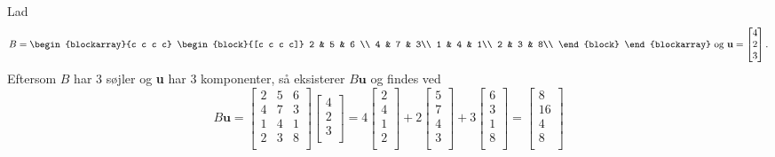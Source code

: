 \begin{eks}
\label{Matrix-vektor}
%
Lad
$$B=
\begin{blockarray}{c c c c}
\begin{block}{[c c c c]}
2 & 5 & 6 \\
4 & 7 & 3\\
1 & 4 & 1\\
2 & 3 & 8\\
\end{block}
\end{blockarray}
%
\text{ og }
%
\textbf{u}=
\begin{bmatrix}
4 \\
2 \\
3 \\ 
\end{bmatrix}.
$$
%
Eftersom $B$ har 3 søjler og \textbf{u} har 3 komponenter, så eksisterer $B\textbf{u}$ og findes ved
$$
B\textbf{u}=
\begin{bmatrix}
2 & 5 & 6 \\
4 & 7 & 3\\
1 & 4 & 1\\
2 & 3 & 8\\
\end{bmatrix}
\begin{bmatrix}
4 \\
2 \\
3 \\ 
\end{bmatrix}
=4
\begin{bmatrix}
2\\
4\\
1\\
2\\
\end{bmatrix}
+2
\begin{bmatrix}
5\\
7\\
4\\
3\\
\end{bmatrix}
+3
\begin{bmatrix}
6\\
3\\
1\\
8\\
\end{bmatrix}
=
\begin{bmatrix}
8\\
16\\
4\\
8\\

\end{bmatrix}$$
\end{eks}
